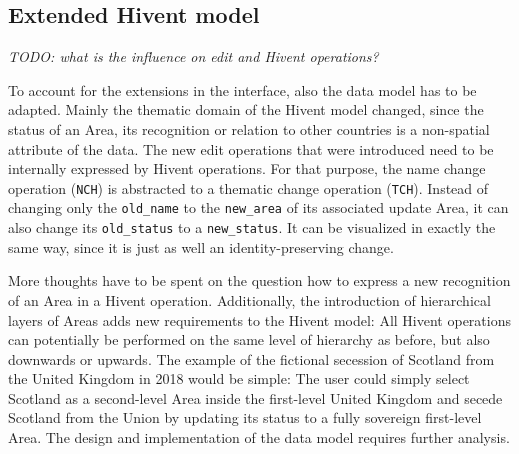 


\subsection{Extended Hivent model} %
\label{sub:extended_hivent_model}

\emph{TODO: what is the influence on edit and Hivent operations?}

To account for the extensions in the interface, also the data model has to be adapted. Mainly the thematic domain of the Hivent model changed, since the status of an Area, its recognition or relation to other countries is a non-spatial attribute of the data. The new edit operations that were introduced need to be internally  expressed by Hivent operations. For that purpose, the name change operation (\texttt{NCH}) is abstracted to a thematic change operation (\texttt{TCH}). Instead of changing only the \texttt{old\_name} to the \texttt{new\_area} of its associated update Area, it can also change its \texttt{old\_status} to a \texttt{new\_status}. It can be visualized in exactly the same way, since it is just as well an identity-preserving change.

More thoughts have to be spent on the question how to express a new recognition of an Area in a Hivent operation. Additionally, the introduction of hierarchical layers of Areas adds new requirements to the Hivent model: All Hivent operations can potentially be performed on the same level of hierarchy as before, but also downwards or upwards. The example of the fictional secession of Scotland from the United Kingdom in 2018 would be simple: The user could simply select Scotland as a second-level Area inside the first-level United Kingdom and secede Scotland from the Union by updating its status to a fully sovereign first-level Area. The design and implementation of the data
model requires further analysis.

